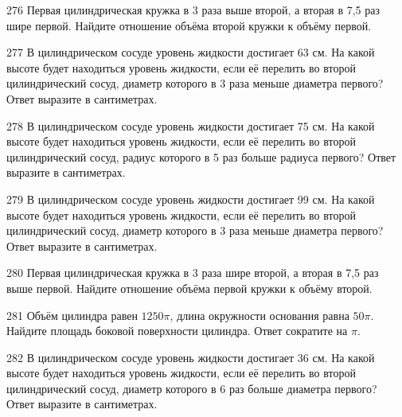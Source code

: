 \documentclass[4apaper]{article}
\begin{document}
\begin{taskBN}{276}
 Первая цилиндрическая кружка в 3 раза выше второй, а вторая в 7,5 раз шире первой. Найдите отношение объёма второй кружки к объёму первой.
\end{taskBN}

\begin{taskBN}{277}
В цилиндрическом сосуде уровень жидкости достигает 63 см. На какой высоте будет находиться уровень жидкости, если её перелить во второй цилиндрический сосуд, диаметр которого в 3 раза меньше диаметра первого? Ответ выразите в сантиметрах.
\end{taskBN}

\begin{taskBN}{278}
В цилиндрическом сосуде уровень жидкости достигает 75 см. На какой высоте будет находиться уровень жидкости, если её перелить во второй цилиндрический сосуд, радиус которого в 5 раз больше радиуса первого? Ответ выразите в сантиметрах.
\end{taskBN}

\begin{taskBN}{279}
В цилиндрическом сосуде уровень жидкости достигает 99 см. На какой высоте будет находиться уровень жидкости, если её перелить во второй цилиндрический сосуд, диаметр которого в 3 раза меньше диаметра первого? Ответ выразите в сантиметрах.
\end{taskBN}

\begin{taskBN}{280}
 Первая цилиндрическая кружка в 3 раза шире второй, а вторая в 7,5 раз выше первой. Найдите отношение объёма первой кружки к объёму второй.
\end{taskBN}

\begin{taskBN}{281}
Объём цилиндра равен $1250\pi$, длина окружности основания равна $50\pi$. Найдите площадь боковой поверхности цилиндра. Ответ сократите на $\pi$.
\end{taskBN}

\begin{taskBN}{282}
В цилиндрическом сосуде уровень жидкости достигает 36 см. На какой высоте будет находиться уровень жидкости, если её перелить во второй цилиндрический сосуд, диаметр которого в 6 раз больше диаметра первого? Ответ выразите в сантиметрах.
\end{taskBN}
\end{document}
